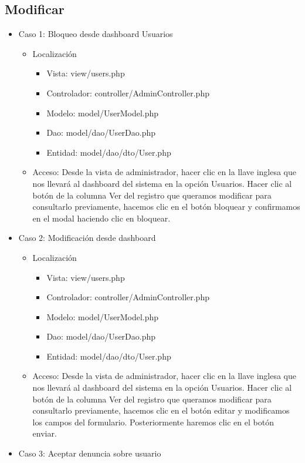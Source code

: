 \subsection{Modificar}
\begin{itemize}
\item Caso 1: Bloqueo desde dashboard Usuarios
\begin{itemize}
\item Localizaci\'{o}n
\begin{itemize}
\item Vista: view/users.php
\item Controlador: controller/AdminController.php
\item Modelo: model/UserModel.php
\item Dao: model/dao/UserDao.php
\item Entidad: model/dao/dto/User.php
\end{itemize}
\item Acceso: Desde la vista de administrador, hacer clic en la llave inglesa que nos llevar\'{a} al dashboard del sistema en la opci\'{o}n Usuarios. Hacer clic al bot\'{o}n de la columna Ver del registro que queramos modificar para consultarlo previamente, hacemos clic en el bot\'{o}n bloquear y confirmamos en el modal haciendo clic en bloquear.
\end{itemize}
\item Caso 2: Modificaci\'{o}n desde dashboard
\begin{itemize}
\item Localizaci\'{o}n
\begin{itemize}
\item Vista: view/users.php
\item Controlador: controller/AdminController.php
\item Modelo: model/UserModel.php
\item Dao: model/dao/UserDao.php
\item Entidad: model/dao/dto/User.php
\end{itemize}
\item Acceso: Desde la vista de administrador, hacer clic en la llave inglesa que nos llevar\'{a} al dashboard del sistema en la opci\'{o}n Usuarios. Hacer clic al bot\'{o}n de la columna Ver del registro que queramos modificar para consultarlo previamente, hacemos clic en el bot\'{o}n editar y modificamos los campos del formulario. Posteriormente haremos clic en el bot\'{o}n enviar.
\end{itemize}
\item Caso 3: Aceptar denuncia sobre usuario

\end{itemize}
